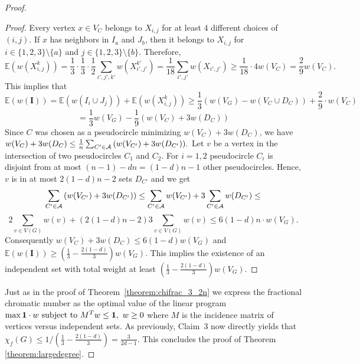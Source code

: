 \documentclass[fontsize=11pt,a4paper,DIV12]{scrartcl}
\def\AA{{\cal A}}
\begin{document}
\begin{proof}
\begin{proof}
  Every vertex $x \in V_C$ belongs to $X_{i,j}$ for at least 4 different
  choices of $(i,j)$. If $x$ has neighbors in $I_a$ and $J_b$, then it belongs
  to $X_{i,j}$ for $i \in \{1,2,3\}\setminus\{a\}$ and
  $j \in \{1,2,3\}\setminus\{b\}$.  Therefore,	
  $$
  \mathbb{E}(w(X_{i,j}^k))=
  \frac{1}{3}\cdot\frac{1}{3}\cdot\frac{1}{2}\sum_{i',j',k'} w(X_{i',j'}^{k'})
  = \frac{1}{18}\sum_{i',j'} w(X_{i',j'}) \geq \frac{1}{18}\cdot 4w(V_C) =
  \frac{2}{9}w(V_C).
  $$
  This implies that
  $$
  \mathbb{E}(w(\mathbf{I}))= \mathbb{E}(w(I_i \cup
  J_j))+\mathbb{E}(w(X_{i,j}^k)) \geq \frac{1}{3}(w(V_G)-w(V_C \cup
  D_C))+\frac{2}{9} \cdot w(V_C)
  $$\vskip-5mm
  $$
  =\frac{1}{3}w(V_G)-\frac{1}{9}(w(V_C)+3w(D_C))
  $$
  Since $C$ was chosen as a pseudocircle minimizing $w(V_C)+3w(D_C)$, we have
  $w(V_C)+3w(D_C) \le \frac{1}{n}\sum_{C' \in \AA}{(w(V_{C'})+3w(D_{C'}))}.$
  Let $v$ be a vertex in the intersection of two pseudocircles $C_1$ and $C_2$. For $i=1,2$
  pseudocircle $C_i$ is disjoint from at most $(n-1) -dn = (1-d)n-1$ other pseudocircles.
  Hence, $v$ is in at most $2(1-d)n -2$ sets $D_{C'}$ and we get
  $$
  \sum_{C' \in \AA}{(w(V_{C'})+3w(D_{C'}))} \leq
  \sum_{C' \in \AA}w(V_{C'})+3\sum_{C' \in \AA}w(D_{C'}) \leq
  $$\vskip-3mm
  $$  
  2\sum_{v \in V(G)}{w(v)} + (2(1-d)n -2)3\sum_{v \in V(G)}{w(v)} \leq
  6(1-d)n\cdot w(V_G).
  $$	
  Consequently $w(V_C)+3w(D_C) \le 6(1-d)w(V_G)$ and 
  $\mathbb{E}(w(\mathbf{I})) \ge (\frac{1}{3}-\frac{2(1-d)}{3})w(V_G)$. This
  implies the existence of an independent set with total weight at least
  $(\frac{1}{3}-\frac{2(1-d)}{3})w(V_G)$.
\end{proof}
	
Just as in the proof of Theorem~\ref{theorem:chifrac_3_2n} we express the
fractional chromatic number as the optimal value of the linear program
$ \max \mathbf{1}\cdot w \hbox{ subject to } M^T w \leq \mathbf{1},\,\,w\geq
0$ where $M$ is the incidence matrix of vertices versus independent sets. As
previously, Claim~3 now directly yields that
$\chi_f(G) \le 1/(\frac{1}{3}-\frac{2(1-d)}{3}) = \frac{3}{2d-1}$.
This concludes the proof of Theorem \ref{theorem:largedegree}.
\end{proof}
\end{document}
